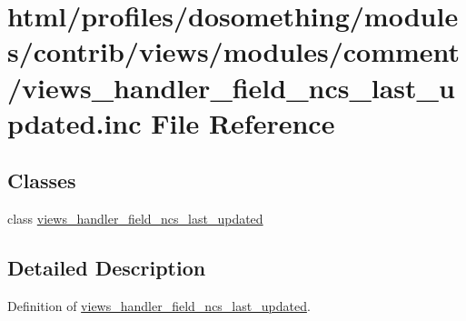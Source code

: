 \hypertarget{views__handler__field__ncs__last__updated_8inc}{
\section{html/profiles/dosomething/modules/contrib/views/modules/comment/views\_\-handler\_\-field\_\-ncs\_\-last\_\-updated.inc File Reference}
\label{views__handler__field__ncs__last__updated_8inc}
}
\subsection*{Classes}
\begin{DoxyCompactItemize}
\item 
class \hyperlink{classviews__handler__field__ncs__last__updated}{views\_\-handler\_\-field\_\-ncs\_\-last\_\-updated}
\end{DoxyCompactItemize}


\subsection{Detailed Description}
Definition of \hyperlink{classviews__handler__field__ncs__last__updated}{views\_\-handler\_\-field\_\-ncs\_\-last\_\-updated}. 